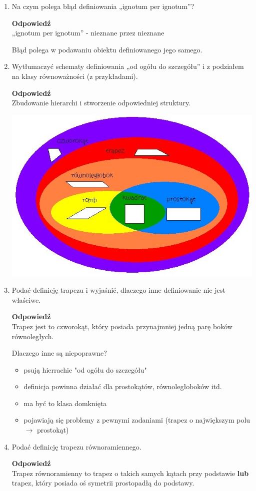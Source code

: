 \documentclass[12pt,a4paper]{article}
\newcounter{definicja}
\theoremstyle{break}
\newcommand{\Odp}[1]{
		\begin{mdframed}[style=zadanie]
			\textbf{Odpowiedź}\\
			#1
		\end{mdframed}
	}
\begin{document}
\begin{enumerate}[1.]
{		Punkt procentowy to różnica między dwoma wartościami procentowymi.
	}
	
	\item Na czym polega błąd definiowania „ignotum per ignotum”?
	\Odp{
		„ignotum per ignotum” - nieznane przez nieznane
		
		Błąd polega w podawaniu obiektu definiowanego jego samego.  
	}
	
	\item Wytłumaczyć schematy definiowania „od ogółu do szczegółu” i z podziałem na klasy równoważności (z przykładami).
	\Odp{
		Zbudowanie hierarchi i stworzenie odpowiedniej struktury.
		
		\includegraphics[width=\linewidth]{czwor.jpg}
	}
	\newpage
	\item Podać definicję trapezu i wyjaśnić, dlaczego inne definiowanie nie jest właściwe.
	\Odp{
		Trapez jest to czworokąt, który posiada przynajmniej jedną parę boków równoległych.
		
		Dlaczego inne są niepoprawne?
		\begin{itemize}
			\item psują hierrachie "od ogółu do szczegółu"
			\item definicja powinna działać dla prostokątów, równoległoboków itd.
			\item ma być to klasa domknięta
			\item pojawiają się problemy z pewnymi zadaniami (trapez o największym polu $\rightarrow$ prostokąt)
		\end{itemize}
	}
	
	\item Podać definicję trapezu równoramiennego.
	\Odp{
	Trapez równoramienny to trapez o takich samych kątach przy podstawie \textbf{lub} trapez, który posiada oś symetrii prostopadłą do podstawy.
	}
	

\end{enumerate}
\end{document}
